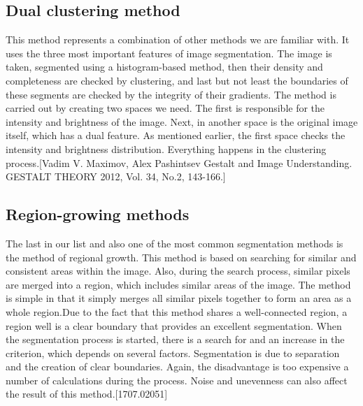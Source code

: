 \subsection{Dual clustering method}\label{sec:3.4.6}
\vspace{-0.5cm}
\noindent This method represents a combination of other methods we are familiar with. It uses the three most important features of image segmentation. The image is taken, segmented using a histogram-based method, then their density and completeness are checked by clustering, and last but not least the boundaries of these segments are checked by the integrity of their gradients. The method is carried out by creating two spaces we need. The first is responsible for the intensity and brightness of the image. Next, in another space is the original image itself, which has a dual feature. As mentioned earlier, the first space checks the intensity and brightness distribution. Everything happens in the clustering process.[Vadim V. Maximov, Alex Pashintsev Gestalt and Image Understanding. GESTALT THEORY 2012, Vol. 34, No.2, 143-166.]

\vspace{-0.3cm}

\subsection{Region-growing methods}\label{sec:3.4.6}
\vspace{-0.5cm}
\noindent The last in our list and also one of the most common segmentation methods is the method of regional growth. This method is based on searching for similar and consistent areas within the image. Also, during the search process, similar pixels are merged into a region, which includes similar areas of the image. The method is simple in that it simply merges all similar pixels together to form an area as a whole region.Due to the fact that this method shares a well-connected region, a region well is a clear boundary that provides an excellent segmentation. When the segmentation process is started, there is a search for and an increase in the criterion, which depends on several factors. Segmentation is due to separation and the creation of clear boundaries. Again, the disadvantage is too expensive a number of calculations during the process. Noise and unevenness can also affect the result of this method.[1707.02051]

